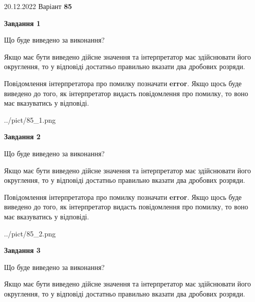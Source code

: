 \documentclass[12pt, ukrainian]{article}
\begin{document}
{20.12.2022 Варіант \No \textbf { 85 }\par}
{
\begin {Large}

{\begin {center}\textbf{Завдання 1}\end {center}}\par
Що буде виведено за виконання? \par

Якщо має бути виведено дійсне значення та інтерпретатор має здійснювати його округлення, 
то у відповіді достатньо правильно вказати два дробових розряди.

Повідомлення інтерпретатора про помилку позначати \textbf{error}.
Якщо щось буде виведено до того, як інтерпретатор видасть повідомлення про помилку, 
то воно має вказуватись у відповіді. \par

\begin{center}
	{../pict/85_1.png}
\end{center}
\newpage

{\begin {center}\textbf{Завдання 2}\end {center}}\par
Що буде виведено за виконання? \par

Якщо має бути виведено дійсне значення та інтерпретатор має здійснювати його округлення, 
то у відповіді достатньо правильно вказати два дробових розряди.

Повідомлення інтерпретатора про помилку позначати \textbf{error}.
Якщо щось буде виведено до того, як інтерпретатор видасть повідомлення про помилку, 
то воно має вказуватись у відповіді. \par

\begin{center}
	{../pict/85_2.png}
\end{center}
\newpage

{\begin {center}\textbf{Завдання 3}\end {center}}\par
Що буде виведено за виконання? \par

Якщо має бути виведено дійсне значення та інтерпретатор має здійснювати його округлення, 
то у відповіді достатньо правильно вказати два дробових розряди.


\end{Large}}
\end{document}
